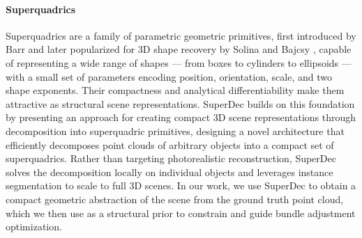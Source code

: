 \paragraph{Superquadrics}
Superquadrics are a family of parametric geometric primitives, first introduced by Barr \cite{1673799} and later popularized for 3D shape recovery by Solina and Bajcsy \cite{article}, capable of representing a wide range of shapes — from boxes to cylinders to ellipsoids — with a small set of parameters encoding position, orientation, scale, and two shape exponents. Their compactness and analytical differentiability make them attractive as structural scene representations. SuperDec \cite{fedele2026superdec3dscenedecomposition} builds on this foundation by presenting an approach for creating compact 3D scene representations through decomposition into superquadric primitives, designing a novel architecture that efficiently decomposes point clouds of arbitrary objects into a compact set of superquadrics. Rather than targeting photorealistic reconstruction, SuperDec solves the decomposition locally on individual objects and leverages instance segmentation to scale to full 3D scenes. In our work, we use SuperDec to obtain a compact geometric abstraction of the scene from the ground truth point cloud, which we then use as a structural prior to constrain and guide bundle adjustment optimization.